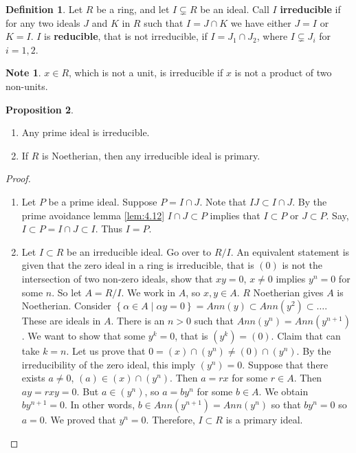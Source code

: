 \documentclass{article}
\newcommand{\rb}[1]{\left( #1 \right)}
\newcommand{\cb}[1]{\left\{ #1 \right\}}
\theoremstyle{definition}\newtheorem{definition}{Definition}[section]
\theoremstyle{definition}\newtheorem{remark}[definition]{Remark}
\theoremstyle{definition}\newtheorem*{example}{Example}
\theoremstyle{definition}\newtheorem*{note}{Note}
\newtheorem{proposition}[definition]{Proposition}
\begin{document}
\begin{definition}
Let $ R $ be a ring, and let $ I \subsetneq R $ be an ideal. Call $ I $ \textbf{irreducible} if for any two ideals $ J $ and $ K $ in $ R $ such that $ I = J \cap K $ we have either $ J = I $ or $ K = I $. $ I $ is \textbf{reducible}, that is not irreducible, if $ I = J_1 \cap J_2 $, where $ I \subsetneq J_i $ for $ i = 1, 2 $.
\end{definition}

\begin{note}
$ x \in R $, which is not a unit, is irreducible if $ x $ is not a product of two non-units.
\end{note}

\begin{proposition}
\label{prop:11.5}
\hfill
\begin{enumerate}
\item Any prime ideal is irreducible.
\item If $ R $ is Noetherian, then any irreducible ideal is primary.
\end{enumerate}
\end{proposition}

\begin{proof}
\hfill
\begin{enumerate}
\item Let $ P $ be a prime ideal. Suppose $ P = I \cap J $. Note that $ IJ \subset I \cap J $. By the prime avoidance lemma \ref{lem:4.12} $ I \cap J \subset P $ implies that $ I \subset P $ or $ J \subset P $. Say, $ I \subset P = I \cap J \subset I $. Thus $ I = P $.
\item Let $ I \subset R $ be an irreducible ideal. Go over to $ R / I $. An equivalent statement is given that the zero ideal in a ring is irreducible, that is $ \rb{0} $ is not the intersection of two non-zero ideals, show that $ xy = 0 $, $ x \ne 0 $ implies $ y^n = 0 $ for some $ n $. So let $ A = R / I $. We work in $ A $, so $ x, y \in A $. $ R $ Noetherian gives $ A $ is Noetherian. Consider $ \cb{\alpha \in A \mid \alpha y = 0} = Ann\rb{y} \subset Ann\rb{y^2} \subset \dots $. These are ideals in $ A $. There is an $ n > 0 $ such that $ Ann\rb{y^n} = Ann\rb{y^{n + 1}} $. We want to show that some $ y^k = 0 $, that is $ \rb{y^k} = \rb{0} $. Claim that can take $ k = n $. Let us prove that $ 0 = \rb{x} \cap \rb{y^n} \ne \rb{0} \cap \rb{y^n} $. By the irreducibility of the zero ideal, this imply $ \rb{y^n} = 0 $. Suppose that there exists $ a \ne 0 $, $ \rb{a} \in \rb{x} \cap \rb{y^n} $. Then $ a = rx $ for some $ r \in A $. Then $ ay = rxy = 0 $. But $ a \in \rb{y^n} $, so $ a = by^n $ for some $ b \in A $. We obtain $ by^{n + 1} = 0 $. In other words, $ b \in Ann\rb{y^{n + 1}} = Ann\rb{y^n} $ so that $ by^n = 0 $ so $ a = 0 $. We proved that $ y^n = 0 $. Therefore, $ I \subset R $ is a primary ideal.
\end{enumerate}
\end{proof}
\end{document}
